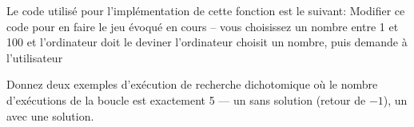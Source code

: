 \documentclass[12pt]{article}
\begin{document}

	\begin{MonExo}
		Le code utilisé pour l'implémentation de cette fonction est le suivant:
		Modifier ce code pour en faire le jeu évoqué en cours -- vous choisissez un nombre entre 1 et 100 et l'ordinateur doit le deviner l'ordinateur choisit un nombre, puis demande à l'utilisateur 
	\end{MonExo}

	\begin{MonExo}
		Donnez deux exemples d'exécution de recherche dichotomique où le nombre d'exécutions de la boucle est exactement 5 --- un sans solution (retour de $-1$), un avec une solution.
	\end{MonExo}
	\begin{MaReponse}
	\end{MaReponse}
	
\end{document}
